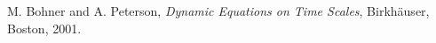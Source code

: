 \documentclass[reqno]{amsart}
\theoremstyle{plain}
\theoremstyle{definition}
\numberwithin{theorem}{section}
\numberwithin{definition}{section}
\numberwithin{prop}{section}
\numberwithin{example}{section}
\begin{document}
\begin{thebibliography}{99}



%
%




M. Bohner and A. Peterson, {\it Dynamic Equations on Time Scales},
Birkh\"auser, Boston, 2001.





\end{thebibliography}
\end{document}
